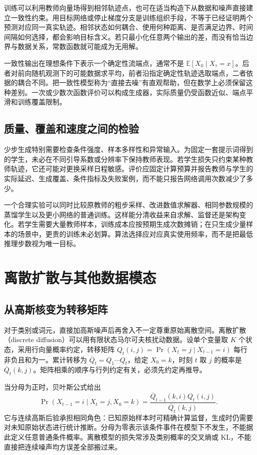 \documentclass[UTF8,12pt,a4paper,fontset=fandol]{ctexart}
\begin{document}
训练可以利用教师向量场得到相邻轨迹点，也可在适当构造下从数据和噪声直接建立一致性约束。用目标网络或停止梯度分支是训练组织手段，不等于已经证明两个预测对应同一真实轨迹。相邻状态如何耦合、使用何种距离、是否满足边界、时间间隔如何选择，都会影响目标含义。若只最小化任意两个输出的差，而没有恰当边界与数据关系，常数函数就可能成为无用解。

一致性输出在理想条件下表示一个确定性流端点，通常不是 $\mathbb E[X_0\mid X_\tau=x]$。后者对前向随机观测下的可能数据求平均，前者沿指定确定性轨迹选取端点，二者依据的耦合不同。把一致性模型称为“直接去噪”有直观帮助，但在数学上必须保留这种差别。一次或少数次函数评价可以构成生成器，实际质量仍受函数近似、端点平滑和训练覆盖限制。

\subsection{质量、覆盖和速度之间的检验}
少步生成特别需要检查条件强度、样本多样性和异常输入。为固定一套提示词得到的学生，未必在不同引导系数或分辨率下保持教师表现。若学生损失只约束某种教师轨迹，它还可能对更换采样日程敏感。评价应固定计算预算并报告教师与学生的实际延迟、生成覆盖、条件指标及失败案例，而不能只报告网络调用次数减少了多少。

一个合理实验可以同时比较原教师的粗步采样、改进数值求解器、相同参数规模的蒸馏学生以及更小网络的普通训练。这样能分清收益来自求解、监督还是架构变化。若学生需要大量教师样本，训练成本应按预期生成次数摊销；在只生成少量样本的场景中，更贵的训练未必划算。算法选择应对应真实使用频率，而不是把最低推理步数视为唯一目标。

\section{离散扩散与其他数据模态}
\label{sec:diff-discrete}
\subsection{从高斯核变为转移矩阵}
对于类别或词元，直接加高斯噪声后再舍入不一定尊重原始离散空间。离散扩散（discrete diffusion）可以用有限状态马尔可夫核扰动数据\cite{austin2021}。设单个变量取 $K$ 个状态，采用行向量概率约定，转移矩阵 $Q_t(i,j)=\Pr(X_t=j\mid X_{t-1}=i)$ 每行非负且和为一。累计转移为 $\overline Q_t=Q_1\cdots Q_t$，给定 $X_0=k$，时刻 $t$ 取 $j$ 的概率是 $\overline Q_t(k,j)$。矩阵相乘的顺序与行列约定有关，必须先约定再推导。

当分母为正时，贝叶斯公式给出
\begin{equation}
 \Pr(X_{t-1}=i\mid X_t=j,X_0=k)
 =\frac{\overline Q_{t-1}(k,i)Q_t(i,j)}{\overline Q_t(k,j)}.
 \label{eq:diff-discrete-posterior}
\end{equation}
它与连续高斯后验承担相同角色：已知原始样本时可精确计算监督，生成时仍需要对未知原始状态进行统计推断。分母为零表示该条件事件在模型下不发生，不能据此定义任意普通条件概率。离散模型的损失常涉及类别概率的交叉熵或 KL，不能直接把连续噪声均方误差全部搬过来。
\end{document}

